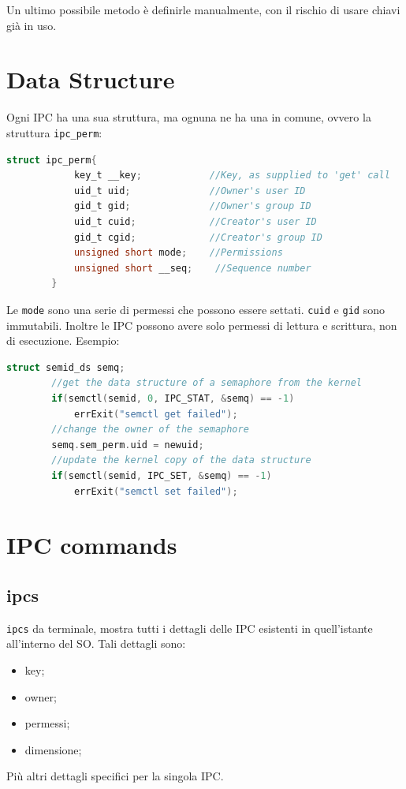 \documentclass[a4paper, 12pt]{book}
\begin{document}
    Un ultimo possibile metodo è definirle manualmente, con 
    il rischio di usare chiavi già in uso.

    \section{Data Structure}

    Ogni IPC ha una sua struttura, ma ognuna ne ha una in comune,
    ovvero la struttura \verb|ipc_perm|:
    \begin{lstlisting}[language=C]
        struct ipc_perm{
            key_t __key;            //Key, as supplied to 'get' call
            uid_t uid;              //Owner's user ID
            gid_t gid;              //Owner's group ID
            uid_t cuid;             //Creator's user ID
            gid_t cgid;             //Creator's group ID
            unsigned short mode;    //Permissions
            unsigned short __seq;    //Sequence number
        }
    \end{lstlisting}
    Le \verb|mode| sono una serie di permessi che possono 
    essere settati. \verb|cuid| e \verb|gid| sono immutabili.
    Inoltre le IPC possono avere solo permessi di lettura 
    e scrittura, non di esecuzione.
    Esempio:
    \begin{lstlisting}[language=C]
        struct semid_ds semq;
        //get the data structure of a semaphore from the kernel 
        if(semctl(semid, 0, IPC_STAT, &semq) == -1)
            errExit("semctl get failed");
        //change the owner of the semaphore
        semq.sem_perm.uid = newuid;
        //update the kernel copy of the data structure 
        if(semctl(semid, IPC_SET, &semq) == -1)
            errExit("semctl set failed");
    \end{lstlisting}
    
    \section{IPC commands}

    \subsection{ipcs}

    \verb|ipcs| da terminale, mostra tutti i dettagli 
    delle IPC esistenti in quell'istante all'interno del SO.
    Tali dettagli sono:
    \begin{itemize}
        \item key;
        \item owner;
        \item permessi;
        \item dimensione;
    \end{itemize}
    Più altri dettagli specifici per la singola IPC.
    
\end{document}
